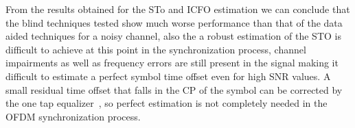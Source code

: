 


From the results obtained for the STo and ICFO estimation we can conclude that the blind techniques tested show much worse performance than that of the data aided techniques for a noisy channel, also the a robust estimation of the STO is difficult to achieve at this point in the synchronization process, channel impairments as well as frequency errors are still present in the signal making it difficult to estimate a perfect symbol time offset even for high SNR values. A small residual time offset that falls in the CP of the symbol can be corrected by the one tap equalizer~\cite{sto_equalization}, so perfect estimation is not completely needed in the OFDM synchronization process. 






